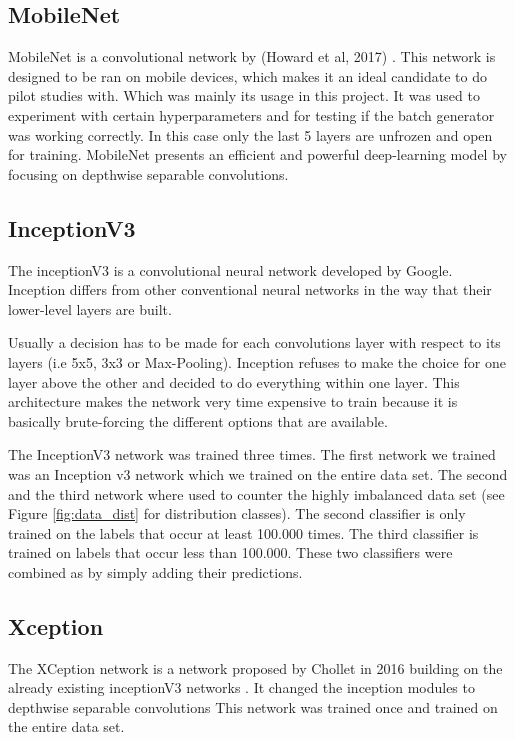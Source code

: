 \documentclass[10pt, a4paper]{article}
\begin{document}
\begin{multicols}{2}
		\subsection{MobileNet}
		MobileNet is a convolutional network by (Howard et al, 2017) \cite{howard2017mobilenets}. This network is designed to be ran on mobile devices, which makes it an ideal candidate to do pilot studies with. Which was mainly its usage in this project. It was used to experiment with certain hyperparameters and for testing if the batch generator was working correctly. In this case only the last 5 layers are unfrozen and open for training. MobileNet presents an efficient and powerful deep-learning model by focusing on depthwise separable convolutions. 
		
		\subsection{InceptionV3}
		The inceptionV3 \cite{DBLP:journals/corr/SzegedyVISW15} is a convolutional neural network developed by Google. Inception differs from other conventional neural networks in the way that their lower-level layers are built.
		
		Usually a decision has to be made for each convolutions layer with respect to its layers (i.e 5x5, 3x3 or Max-Pooling). Inception refuses to make the choice for one layer above the other and decided to do everything within one layer. This architecture makes the network very time expensive to train because it is basically brute-forcing the different options that are available.
		
		The InceptionV3 network was trained three times. The first network we trained was an Inception v3 network which we trained on the entire data set. The second and the third network where used to counter the highly imbalanced data set (see Figure \ref{fig:data_dist} for distribution classes). The second classifier is only trained on the labels that occur at least 100.000 times. The third classifier is trained on labels that occur less than 100.000. These two classifiers were combined as by simply adding their predictions. 

		\subsection{Xception}
		The XCeption network is a network proposed by Chollet in 2016 building on the already existing inceptionV3 networks \cite{chollet2016xception}. 
		It changed the inception modules to depthwise separable convolutions 
		This network was trained once and trained on the entire data set.
		

\end{multicols}
\end{document}
